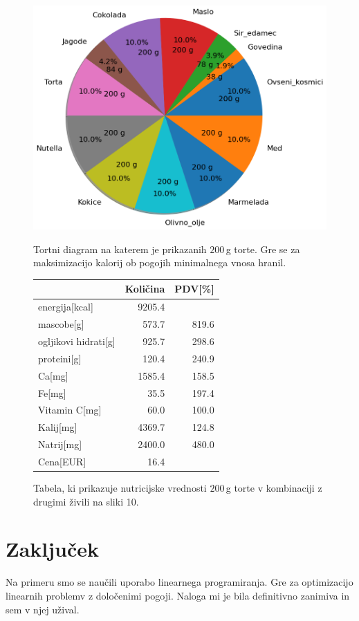 \documentclass[slovene,11pt,a4paper]{article}
\begin{document}
\begin{figure}[h!]
  \centering
  \begin{minipage}[h]{0.56\textwidth}
    \includegraphics[width=\textwidth]{piechart5.png}
    \caption{Tortni diagram na katerem je prikazanih $200\,$g torte. Gre se za maksimizacijo kalorij ob pogojih minimalnega vnosa hranil.}
  \end{minipage}
  \hfill
  \begin{minipage}[h]{0.42\textwidth}
	\begin{tabular}{lrr}
		\toprule
		{} &  Količina &  PDV[\%] \\
		\midrule
		energija[kcal]       &    9205.4 &         \\
		mascobe[g]           &     573.7 &   819.6 \\
		ogljikovi hidrati[g] &     925.7 &   298.6 \\
		proteini[g]          &     120.4 &   240.9 \\
		Ca[mg]               &    1585.4 &   158.5 \\
		Fe[mg]               &      35.5 &   197.4 \\
		Vitamin C[mg]        &      60.0 &   100.0 \\
		Kalij[mg]            &    4369.7 &   124.8 \\
		Natrij[mg]           &    2400.0 &   480.0 \\
		Cena[EUR]            &      16.4 &         \\
		\bottomrule
		\end{tabular}
	\caption{Tabela, ki prikazuje nutricijske vrednosti $200\,$g torte v kombinaciji z drugimi živili na sliki 10.}
  \end{minipage}
\end{figure}

\section{Zaključek}

Na primeru smo se naučili uporabo linearnega programiranja. Gre za optimizacijo linearnih problemv z določenimi pogoji. Naloga mi je bila definitivno zanimiva in sem v njej užival.
\end{document}
